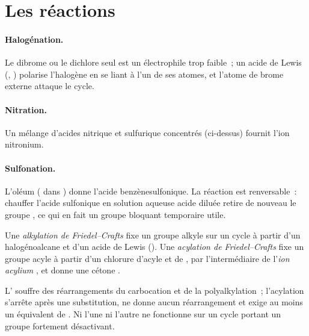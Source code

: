 \section{Les réactions}

\paragraph{Halogénation.} Le dibrome ou le dichlore seul est un électrophile trop faible~; un acide
de Lewis (, ) polarise l'halogène en se liant à l'un de ses atomes, et l'atome
de brome externe attaque le cycle.

\paragraph{Nitration.} Un mélange d'acides nitrique et sulfurique concentrés (ci-dessus) fournit
l'ion nitronium.

\paragraph{Sulfonation.} L'oléum ( dans ) donne l'acide benzènesulfonique.
La réaction est renversable~: chauffer l'acide sulfonique en solution aqueuse acide diluée retire
de nouveau le groupe , ce qui en fait un groupe bloquant temporaire utile.

\begin{definition}\label{def:b2:aromatic-substitution:friedel-crafts}
Une \emph{alkylation de Friedel--Crafts} fixe un groupe
alkyle sur un cycle  à partir d'un halogénoalcane et d'un acide de Lewis (). Une
\emph{acylation de Friedel--Crafts} fixe un groupe acyle
 à partir d'un chlorure d'acyle et de , par l'intermédiaire de l'\emph{ion acylium}
, et donne une cétone .
\end{definition}

\begin{proposition}\label{prop:b2:aromatic-substitution:friedel-crafts-limits}
L' souffre des réarrangements du carbocation et de la
polyalkylation~; l'acylation s'arrête après une substitution, ne donne aucun réarrangement et
exige au moins un équivalent de . Ni l'une ni l'autre ne fonctionne sur un cycle
portant un groupe fortement désactivant.
\end{proposition}


